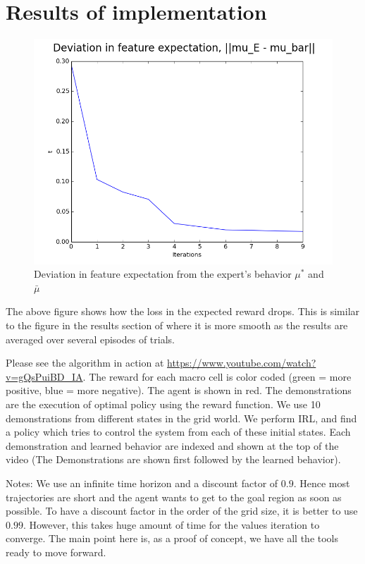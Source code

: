 \documentclass{article}[11pt]
\begin{document}
\section{Results of implementation}
\begin{figure}[H]
  \begin{center}
    \includegraphics[width=0.9\linewidth]{images/figure_1}
    \caption{Deviation in feature expectation from the expert's behavior $\mu^*$ and $\bar{\mu}$}
    \label{fig:converge}
  \end{center}
\end{figure}

The above figure shows how the loss in the expected reward drops. This is similar to the figure in the results section of \cite{abbeel2004apprenticeship} where it is more smooth as the results are averaged over several episodes of trials. 

Please see the algorithm in action at \url{https://www.youtube.com/watch?v=gQsPuiBD_IA}. The reward for each macro cell is color coded (green = more positive, blue = more negative). The agent is shown in red. The demonstrations are the execution of optimal policy using the reward function. We use 10 demonstrations from different states in the grid world. We perform IRL, and find a policy which tries to control the system from each of these initial states. Each demonstration and learned behavior are indexed and shown at the top of the video (The Demonstrations are shown first followed by the learned behavior).


Notes: We use an infinite time horizon and a discount factor of $0.9$. Hence most trajectories are short and the agent wants to get to the goal region as soon as possible. To have a discount factor in the order of the grid size, it is better to use $0.99$. However, this takes huge amount of time for the values iteration to converge. The main point here is, as a proof of concept, we have all the tools ready to move forward. 
\end{document}
